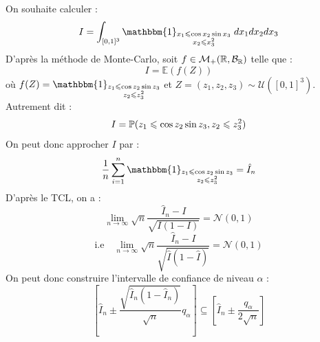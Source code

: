 \begin{example}
    On souhaite calculer : 
        $$I = \int_{[0,1]^3} \mathbbm{1}_{\substack{x_1 \leqslant \cos x_2 \sin x_3 \\ x_2 \leqslant x_3^2}} \; dx_1 dx_2 dx_3 $$ 
    D'après la méthode de Monte-Carlo, soit $f \in \mathcal{M}_+(\mathbb{R}, \mathcal{B}_{\mathbb{R}} )$ telle que : 
        $$I = \mathbb{E}(f(Z)) $$ 
    où $ f(Z) =  \mathbbm{1}_{\substack{z_1 \leqslant \cos z_2 \sin z_3 \\ z_2 \leqslant z_3^2}}$ et 
    $Z = (z_1, z_2, z_3) \sim \mathcal{U}([0,1]^3) $. Autrement dit : 
        $$I = \mathbb{P}(z_1 \leqslant \cos z_2 \sin z_3, z_2 \leqslant z_3^2) $$ 
    On peut donc approcher $I$ par : 
        $$ \frac{1}{n} \sum_{i=1}^{n} \mathbbm{1}_{\substack{z_1 \leqslant \cos z_2 \sin z_3 \\ z_2 \leqslant z_3^2}} = \hat{I}_n $$ 
    D'après le TCL, on a : 
        $$ \lim_{n \to \infty} \sqrt{n} \frac{ \hat{I}_n - I}{\sqrt{I(1-I)}} = \mathcal{N}(0,1) $$ 
        $$ \text{i.e} \quad \lim_{n \to \infty} \sqrt{n} \frac{ \hat{I}_n - I}{\sqrt{\hat{I}(1 - \hat{I})}} = \mathcal{N}(0,1) $$
    On peut donc construire l'intervalle de confiance de niveau $ \alpha$ : 
        $$ \left[ \hat{I}_n \pm \frac{\sqrt{\hat{I}_n (1 - \hat{I}_n)}}{\sqrt{n}} q_\alpha\right] \subseteq \left[ \hat{I}_n \pm \frac{q_\alpha}{2 \sqrt{n}}\right] $$
\end{example}



